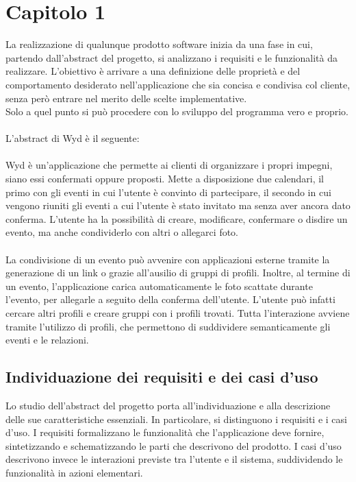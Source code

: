 \chapter{Capitolo 1}

La realizzazione di qualunque prodotto software inizia da una fase in cui,
partendo dall’abstract del progetto, si analizzano i requisiti e le funzionalità da realizzare.
L’obiettivo è arrivare a una definizione delle proprietà e
del comportamento desiderato nell’applicazione che sia concisa e condivisa col cliente,
senza però entrare nel merito delle scelte implementative.\\
Solo a quel punto si può procedere con lo sviluppo del programma vero e proprio.\\
\\
L'abstract di Wyd è il seguente:\\
\\
Wyd è un'applicazione che permette ai clienti di organizzare i propri impegni,
siano essi confermati oppure proposti.
Mette a disposizione due calendari,
il primo con gli eventi in cui l'utente è convinto di partecipare,
il secondo in cui vengono riuniti gli eventi a cui l'utente è stato invitato ma senza aver ancora dato conferma.
L'utente ha la possibilità di creare, modificare, confermare o disdire un evento,
ma anche condividerlo con altri o allegarci foto.\\
\\
La condivisione di un evento può avvenire con applicazioni esterne tramite la generazione di un link o
grazie all'ausilio di gruppi di profili.
Inoltre, al termine di un evento, l'applicazione carica automaticamente le foto scattate
durante l'evento, per allegarle a seguito della conferma dell'utente.
L'utente può infatti cercare altri profili e creare gruppi con i profili trovati.
Tutta l'interazione avviene tramite l'utilizzo di profili,
che permettono di suddividere semanticamente gli eventi e le relazioni.
\clearpage

\section{Individuazione dei requisiti e dei casi d’uso}

Lo studio dell’abstract del progetto porta all’individuazione e
alla descrizione delle sue caratteristiche essenziali.
In particolare, si distinguono i requisiti e i casi d'uso.
I requisiti formalizzano le funzionalità che l'applicazione deve fornire,
sintetizzando e schematizzando le parti che descrivono del prodotto.
I casi d'uso descrivono invece le interazioni previste tra l'utente e il sistema,
suddividendo le funzionalità in azioni elementari.\\
